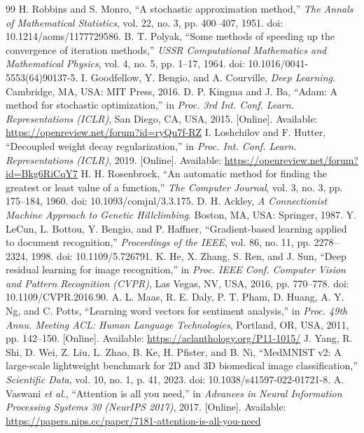 \documentclass[a4paper,12pt]{article}
\begin{document}
\begin{thebibliography}{99}
 H. Robbins and S. Monro, “A stochastic approximation method,” \emph{The Annals of Mathematical Statistics}, vol. 22, no. 3, pp. 400–407, 1951. doi: 10.1214/aoms/1177729586.
 B. T. Polyak, “Some methods of speeding up the convergence of iteration methods,” \emph{USSR Computational Mathematics and Mathematical Physics}, vol. 4, no. 5, pp. 1–17, 1964. doi: 10.1016/0041-5553(64)90137-5.
 I. Goodfellow, Y. Bengio, and A. Courville, \emph{Deep Learning}. Cambridge, MA, USA: MIT Press, 2016.
 D. P. Kingma and J. Ba, “Adam: A method for stochastic optimization,” in \emph{Proc. 3rd Int. Conf. Learn. Representations (ICLR)}, San Diego, CA, USA, 2015. [Online]. Available: \url{https://openreview.net/forum?id=ryQu7f-RZ}
 I. Loshchilov and F. Hutter, “Decoupled weight decay regularization,” in \emph{Proc. Int. Conf. Learn. Representations (ICLR)}, 2019. [Online]. Available: \url{https://openreview.net/forum?id=Bkg6RiCqY7}
 H. H. Rosenbrock, “An automatic method for finding the greatest or least value of a function,” \emph{The Computer Journal}, vol. 3, no. 3, pp. 175–184, 1960. doi: 10.1093/comjnl/3.3.175.
 D. H. Ackley, \emph{A Connectionist Machine Approach to Genetic Hillclimbing}. Boston, MA, USA: Springer, 1987.
 Y. LeCun, L. Bottou, Y. Bengio, and P. Haffner, “Gradient-based learning applied to document recognition,” \emph{Proceedings of the IEEE}, vol. 86, no. 11, pp. 2278–2324, 1998. doi: 10.1109/5.726791.
 K. He, X. Zhang, S. Ren, and J. Sun, “Deep residual learning for image recognition,” in \emph{Proc. IEEE Conf. Computer Vision and Pattern Recognition (CVPR)}, Las Vegas, NV, USA, 2016, pp. 770–778. doi: 10.1109/CVPR.2016.90.
 A. L. Maas, R. E. Daly, P. T. Pham, D. Huang, A. Y. Ng, and C. Potts, “Learning word vectors for sentiment analysis,” in \emph{Proc. 49th Annu. Meeting ACL: Human Language Technologies}, Portland, OR, USA, 2011, pp. 142–150. [Online]. Available: \url{https://aclanthology.org/P11-1015/}
 J. Yang, R. Shi, D. Wei, Z. Liu, L. Zhao, B. Ke, H. Pfister, and B. Ni, “MedMNIST v2: A large-scale lightweight benchmark for 2D and 3D biomedical image classification,” \emph{Scientific Data}, vol. 10, no. 1, p. 41, 2023. doi: 10.1038/s41597-022-01721-8.
 A. Vaswani \emph{et al}., “Attention is all you need,” in \emph{Advances in Neural Information Processing Systems 30 (NeurIPS 2017)}, 2017. [Online]. Available: \url{https://papers.nips.cc/paper/7181-attention-is-all-you-need}

\end{thebibliography}
\end{document}
